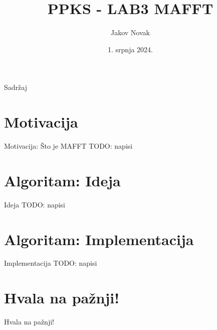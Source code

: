 \documentclass[aspectratio=169]{beamer}
\title[autodiff]{PPKS - LAB3 MAFFT}
\author{Jakov Novak\\}
\institute{Sveučilište u Zagrebu, Fakultet elektrotehnike i računarstva\\}
\date{1. srpnja 2024.}
\begin{document}
\maketitle

\begin{frame}{Sadržaj}
    \tableofcontents
\end{frame}

\section{Motivacija}
\begin{frame}{Motivacija: Što je MAFFT}
  TODO: napisi
\end{frame}

\section{Algoritam: Ideja}
\begin{frame}{Ideja}
  TODO: napisi
\end{frame}

\section{Algoritam: Implementacija}
\begin{frame}{Implementacija}
  TODO: napisi
\end{frame}

\section*{Hvala na pažnji!}
\begin{frame}
    \centering
    \vfill
    {\fontsize{40}{50}\selectfont Hvala na pažnji!}
    \vfill
\end{frame}
\end{document}
